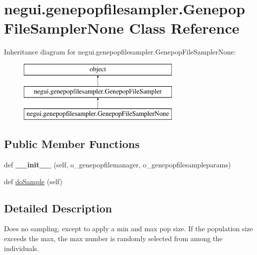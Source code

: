 \hypertarget{classnegui_1_1genepopfilesampler_1_1GenepopFileSamplerNone}{}\section{negui.\+genepopfilesampler.\+Genepop\+File\+Sampler\+None Class Reference}
\label{classnegui_1_1genepopfilesampler_1_1GenepopFileSamplerNone}
Inheritance diagram for negui.\+genepopfilesampler.\+Genepop\+File\+Sampler\+None\+:\begin{figure}[H]
\begin{center}
\leavevmode
\includegraphics[height=3.000000cm]{classnegui_1_1genepopfilesampler_1_1GenepopFileSamplerNone}
\end{center}
\end{figure}
\subsection*{Public Member Functions}
\begin{DoxyCompactItemize}
\item 
def {\bfseries \+\_\+\+\_\+init\+\_\+\+\_\+} (self, o\+\_\+genepopfilemanager, o\+\_\+genepopfilesampleparams)\hypertarget{classnegui_1_1genepopfilesampler_1_1GenepopFileSamplerNone_a80379ccae205d2dc712898f429f81019}{}\label{classnegui_1_1genepopfilesampler_1_1GenepopFileSamplerNone_a80379ccae205d2dc712898f429f81019}

\item 
def \hyperlink{classnegui_1_1genepopfilesampler_1_1GenepopFileSamplerNone_a9e2c8b2d724ae8df46f21527486b485d}{do\+Sample} (self)
\end{DoxyCompactItemize}


\subsection{Detailed Description}
\begin{DoxyVerb}Does no sampling, except to apply a min and max pop size.  If
the population size exceeds the max, the max number is randomly
selected from among the individuals.
\end{DoxyVerb}
 

